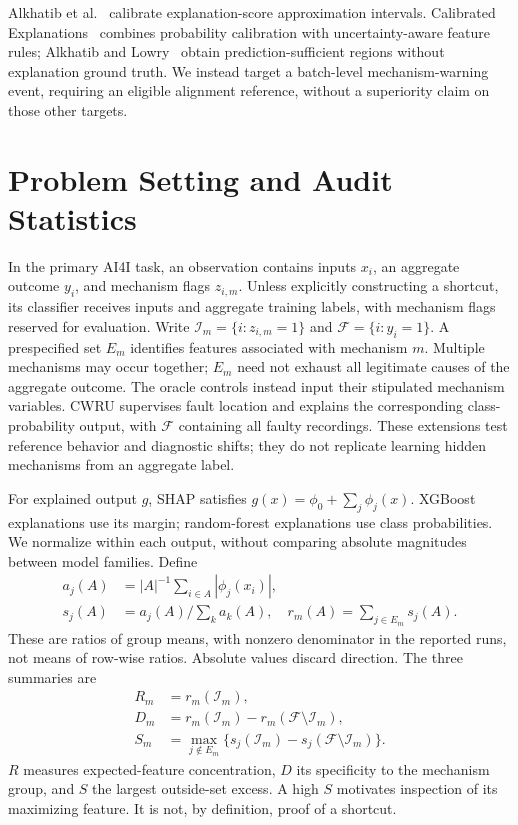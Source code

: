 \documentclass[conference]{IEEEtran}
\begin{document}
Alkhatib et al.~\cite{alkhatib2023approximating} calibrate explanation-score approximation intervals. Calibrated Explanations~\cite{lofstrom2024calibrated} combines probability calibration with uncertainty-aware feature rules; Alkhatib and Lowry~\cite{alkhatib2026sufficient} obtain prediction-sufficient regions without explanation ground truth. We instead target a batch-level mechanism-warning event, requiring an eligible alignment reference, without a superiority claim on those other targets.

\section{Problem Setting and Audit Statistics}
\label{sec:background}
In the primary AI4I task, an observation contains inputs $x_i$, an aggregate outcome $y_i$, and mechanism flags $z_{i,m}$. Unless explicitly constructing a shortcut, its classifier receives inputs and aggregate training labels, with mechanism flags reserved for evaluation. Write $\mathcal I_m=\{i:z_{i,m}=1\}$ and $\mathcal F=\{i:y_i=1\}$. A prespecified set $E_m$ identifies features associated with mechanism $m$. Multiple mechanisms may occur together; $E_m$ need not exhaust all legitimate causes of the aggregate outcome. The oracle controls instead input their stipulated mechanism variables. CWRU supervises fault location and explains the corresponding class-probability output, with $\mathcal F$ containing all faulty recordings. These extensions test reference behavior and diagnostic shifts; they do not replicate learning hidden mechanisms from an aggregate label.

For explained output $g$, SHAP satisfies $g(x)=\phi_0+\sum_j\phi_j(x)$. XGBoost explanations use its margin; random-forest explanations use class probabilities. We normalize within each output, without comparing absolute magnitudes between model families. Define
\begin{align}
 a_j(A)&=|A|^{-1}\sum_{i\in A}|\phi_j(x_i)|,\\
 s_j(A)&=a_j(A)/\sum_k a_k(A),\quad r_m(A)=\sum_{j\in E_m}s_j(A).
\end{align}
These are ratios of group means, with nonzero denominator in the reported runs, not means of row-wise ratios. Absolute values discard direction. The three summaries are
\begin{align}
 R_m&=r_m(\mathcal I_m),\label{eq:share}\\
 D_m&=r_m(\mathcal I_m)-r_m(\mathcal F\setminus\mathcal I_m),\label{eq:spec}\\
 S_m&=\max_{j\notin E_m}\{s_j(\mathcal I_m)-s_j(\mathcal F\setminus\mathcal I_m)\}.\label{eq:shortcut}
\end{align}
$R$ measures expected-feature concentration, $D$ its specificity to the mechanism group, and $S$ the largest outside-set excess. A high $S$ motivates inspection of its maximizing feature. It is not, by definition, proof of a shortcut.
\end{document}
